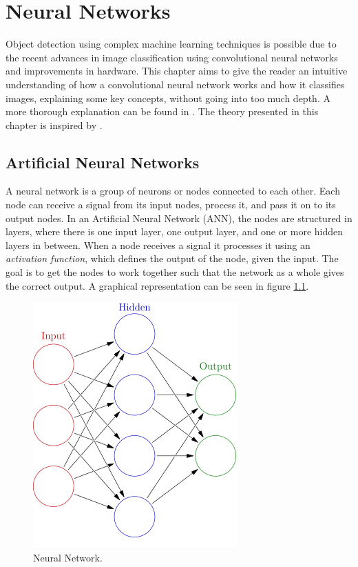 
\chapter{Neural Networks}
Object detection using complex machine learning techniques is possible due to the recent advances in image classification using convolutional neural networks and improvements in hardware. This chapter aims to give the reader an intuitive understanding of how a convolutional neural network works and how it classifies images, explaining some key concepts, without going into too much depth. A more thorough explanation can be found in \citep{Krizhevsky2012}. The theory presented in this chapter is inspired by \citep{cnn_stanford}.

\section{Artificial Neural Networks}
A neural network is a group of neurons or nodes connected to each other. Each node can receive a signal from its input nodes, process it, and pass it on to its output nodes. In an Artificial Neural Network (ANN), the nodes are structured in layers, where there is one input layer, one output layer, and one or more hidden layers in between. When a node receives a signal it processes it using an \textit{activation function}, which defines the output of the node, given the input. The goal is to get the nodes to work together such that the network as a whole gives the correct output. A graphical representation can be seen in figure \ref{fig:NN}.

\begin{figure}
    \centering
    \includegraphics[scale=0.4]{fig/neural_network.png}
    \caption{Neural Network.}
    \label{fig:NN}
\end{figure}

